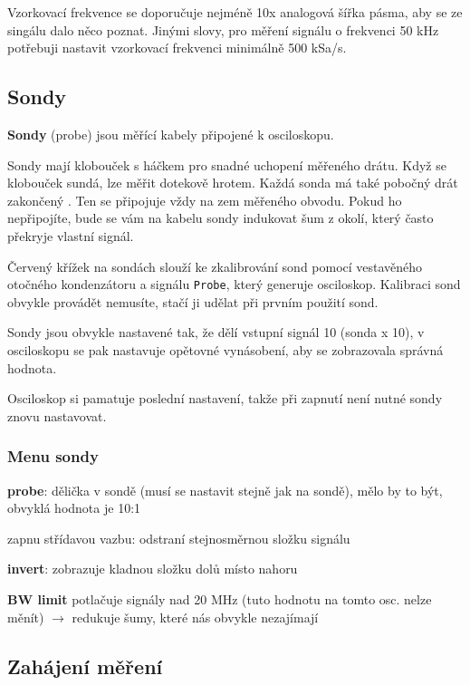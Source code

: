 Vzorkovací frekvence se doporučuje nejméně 10x analogová šířka pásma, aby se ze singálu dalo něco poznat. 
Jinými slovy, pro měření signálu o frekvenci 50 kHz potřebuji nastavit vzorkovací frekvenci minimálně 500 kSa/s.

\subsection{Sondy}

\textbf{Sondy} (probe) jsou měřící kabely připojené k osciloskopu. 

Sondy  mají klobouček s háčkem pro snadné uchopení měřeného drátu. Když se klobouček sundá, lze měřit dotekově hrotem. 
Každá sonda má také pobočný drát zakončený . 
Ten se připojuje vždy na zem měřeného obvodu. 
Pokud ho nepřipojíte, bude se vám na kabelu sondy indukovat šum z okolí, který často překryje vlastní signál. 

Červený křížek na sondách slouží ke zkalibrování sond pomocí vestavěného otočného kondenzátoru a signálu \texttt{Probe}, který generuje osciloskop. 
Kalibraci sond obvykle provádět nemusíte, stačí ji udělat při prvním použití sond. 

Sondy jsou obvykle nastavené tak, že dělí vstupní signál 10 (sonda x 10), v osciloskopu se pak nastavuje opětovné vynásobení, 
aby se zobrazovala správná hodnota. 

Osciloskop si pamatuje poslední nastavení, takže při zapnutí není nutné sondy znovu nastavovat. 


\subsubsection{Menu sondy}

\textbf{probe}: dělička v sondě (musí se nastavit stejně jak na sondě), mělo by to být, obvyklá hodnota je 10:1

zapnu střídavou vazbu: odstraní stejnosměrnou složku signálu %

\textbf{invert}: zobrazuje kladnou složku dolů místo nahoru 

\textbf{BW limit} potlačuje signály nad 20 MHz (tuto hodnotu na tomto osc. nelze měnít) $\rightarrow$ redukuje šumy, které nás obvykle nezajímají  


\subsection{Zahájení měření}


